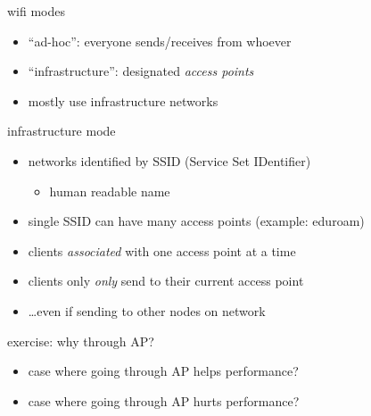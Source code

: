 \begin{frame}{wifi modes}
    \begin{itemize}
    \item ``ad-hoc'': everyone sends/receives from whoever
    \item ``infrastructure'': designated \textit{access points}
    \vspace{.5cm}
    \item mostly use infrastructure networks
    \end{itemize}
\end{frame}

\begin{frame}{infrastructure mode}
    \begin{itemize}
    \item networks identified by SSID (Service Set IDentifier)
        \begin{itemize}
        \item human readable name
        \end{itemize}
    \item single SSID can have many access points (example: eduroam)
    \item clients \textit{associated} with one access point at a time
    \vspace{.5cm}
    \item clients only \textit{only} send to their current access point
    \item \ldots even if sending to other nodes on network
    \end{itemize}
\end{frame}

\begin{frame}{exercise: why through AP?}
    \begin{itemize}
    \item case where going through AP helps performance?
    \item case where going through AP hurts performance?
    \end{itemize}
\end{frame}

